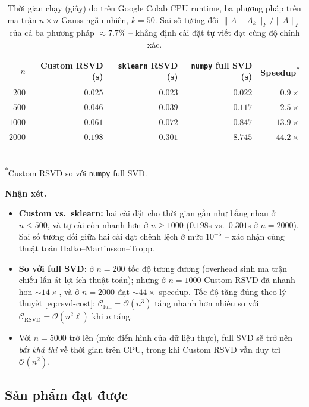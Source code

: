 \begin{table}[ht]
\centering
\caption{Thời gian chạy (giây) đo trên Google Colab CPU runtime, ba phương
pháp trên ma trận $n\times n$ Gauss ngẫu nhiên, $k = 50$. Sai số tương đối
$\|A - A_k\|_F / \|A\|_F$ của cả ba phương pháp $\approx 7.7\%$ -- khẳng định
cài đặt tự viết đạt cùng độ chính xác.}
\label{tab:benchmark-time}
\begin{tabular}{rrrrr}
\toprule
$n$ & Custom RSVD (s) & \texttt{sklearn} RSVD (s) & \texttt{numpy} full SVD (s) & Speedup\textsuperscript{*} \\
\midrule
$200$  & $0.025$ & $0.023$ & $0.022$ & $0.9\times$ \\
$500$  & $0.046$ & $0.039$ & $0.117$ & $2.5\times$ \\
$1000$ & $0.061$ & $0.072$ & $0.847$ & $13.9\times$ \\
$2000$ & $0.198$ & $0.301$ & $8.745$ & $44.2\times$ \\
\bottomrule
\end{tabular}\\[2pt]
\footnotesize\textsuperscript{*}Custom RSVD so với \texttt{numpy} full SVD.
\end{table}

\textbf{Nhận xét.}
\begin{itemize}
    \item \textbf{Custom vs.\ sklearn:} hai cài đặt cho thời gian gần như
    bằng nhau ở $n \le 500$, và tự cài còn nhanh hơn ở $n \ge 1000$
    ($0.198$s vs.\ $0.301$s ở $n = 2000$). Sai số tương đối giữa hai cài đặt
    chênh lệch ở mức $10^{-5}$ -- xác nhận cùng thuật toán Halko--Martinsson--Tropp.

    \item \textbf{So với full SVD:} ở $n = 200$ tốc độ tương đương (overhead
    sinh ma trận chiếu lấn át lợi ích thuật toán); nhưng ở $n = 1000$ Custom
    RSVD đã nhanh hơn $\sim 14\times$, và ở $n = 2000$ đạt $\sim 44\times$
    speedup. Tốc độ tăng đúng theo lý thuyết \eqref{eq:rsvd-cost}:
    $\mathcal{C}_{\mathrm{full}} = \mathcal{O}(n^3)$ tăng nhanh hơn nhiều so với
    $\mathcal{C}_{\mathrm{RSVD}} = \mathcal{O}(n^2 \ell)$ khi $n$ tăng.

    \item Với $n = 5000$ trở lên (mức điển hình của dữ liệu thực), full SVD
    sẽ trở nên \emph{bất khả thi} về thời gian trên CPU, trong khi Custom
    RSVD vẫn duy trì $\mathcal{O}(n^2)$.
\end{itemize}

\subsection{Sản phẩm đạt được}\label{subsec:deliverables}


